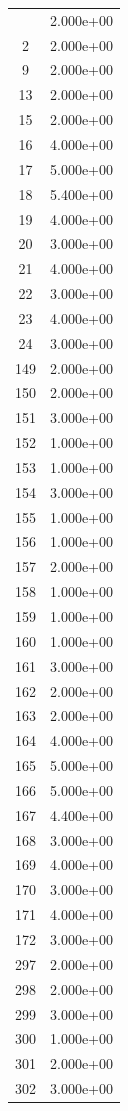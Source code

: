\documentclass[12pt]{article}
\begin{document}
\begin{longtable}{@{}cc@{}}
\bottomrule
\endlastfoot
1 & 2.000e+00 \\
2 & 2.000e+00 \\
9 & 2.000e+00 \\
13 & 2.000e+00 \\
15 & 2.000e+00 \\
16 & 4.000e+00 \\
17 & 5.000e+00 \\
18 & 5.400e+00 \\
19 & 4.000e+00 \\
20 & 3.000e+00 \\
21 & 4.000e+00 \\
22 & 3.000e+00 \\
23 & 4.000e+00 \\
24 & 3.000e+00 \\
149 & 2.000e+00 \\
150 & 2.000e+00 \\
151 & 3.000e+00 \\
152 & 1.000e+00 \\
153 & 1.000e+00 \\
154 & 3.000e+00 \\
155 & 1.000e+00 \\
156 & 1.000e+00 \\
157 & 2.000e+00 \\
158 & 1.000e+00 \\
159 & 1.000e+00 \\
160 & 1.000e+00 \\
161 & 3.000e+00 \\
162 & 2.000e+00 \\
163 & 2.000e+00 \\
164 & 4.000e+00 \\
165 & 5.000e+00 \\
166 & 5.000e+00 \\
167 & 4.400e+00 \\
168 & 3.000e+00 \\
169 & 4.000e+00 \\
170 & 3.000e+00 \\
171 & 4.000e+00 \\
172 & 3.000e+00 \\
297 & 2.000e+00 \\
298 & 2.000e+00 \\
299 & 3.000e+00 \\
300 & 1.000e+00 \\
301 & 2.000e+00 \\
302 & 3.000e+00 \\

\end{longtable}
\end{document}
